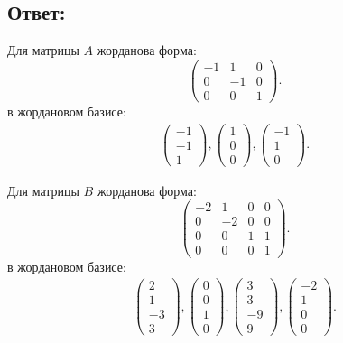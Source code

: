 \documentclass[12pt]{article}
\begin{document}
    \subsection*{Ответ:}
    Для матрицы $A$ жорданова форма:
    \[
        \begin{pmatrix}
            -1 & 1  & 0 \\
            0  & -1 & 0 \\
            0  & 0  & 1
        \end{pmatrix}.
    \]
    в жордановом базисе:
    \begin{gather*}
        \begin{pmatrix}
            -1 \\ -1 \\ 1
        \end{pmatrix},
        \begin{pmatrix}
            1 \\ 0 \\ 0
        \end{pmatrix},
        \begin{pmatrix}
            -1 \\ 1 \\ 0
        \end{pmatrix} .
    \end{gather*}

    Для матрицы $B$ жорданова форма:
    \[
        \begin{pmatrix}
            -2 & 1  & 0 & 0 \\
            0  & -2 & 0 & 0 \\
            0  & 0  & 1 & 1 \\
            0  & 0  & 0 & 1
        \end{pmatrix}.
    \]
    в жордановом базисе:
    \begin{gather*}
        \begin{pmatrix}
            2 \\ 1 \\ -3 \\ 3
        \end{pmatrix} ,
        \begin{pmatrix}
            0 \\ 0 \\ 1 \\ 0
        \end{pmatrix},
        \begin{pmatrix}
            3 \\ 3 \\ -9 \\ 9
        \end{pmatrix},
        \begin{pmatrix}
            -2 \\ 1 \\ 0 \\ 0
        \end{pmatrix}.
    \end{gather*}
\end{document}
